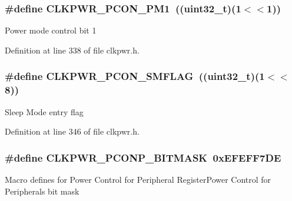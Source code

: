 \subsubsection[{\texorpdfstring{C\+L\+K\+P\+W\+R\+\_\+\+P\+C\+O\+N\+\_\+\+P\+M1}{CLKPWR_PCON_PM1}}]{\setlength{\rightskip}{0pt plus 5cm}\#define C\+L\+K\+P\+W\+R\+\_\+\+P\+C\+O\+N\+\_\+\+P\+M1~(({\bf uint32\+\_\+t})(1$<$$<$1))}\hypertarget{group___c_l_k_p_w_r___private___macros_ga0ab773fbd9de0524bee62239fd9afc78}{}\label{group___c_l_k_p_w_r___private___macros_ga0ab773fbd9de0524bee62239fd9afc78}
Power mode control bit 1 

Definition at line 338 of file clkpwr.\+h.

\subsubsection[{\texorpdfstring{C\+L\+K\+P\+W\+R\+\_\+\+P\+C\+O\+N\+\_\+\+S\+M\+F\+L\+AG}{CLKPWR_PCON_SMFLAG}}]{\setlength{\rightskip}{0pt plus 5cm}\#define C\+L\+K\+P\+W\+R\+\_\+\+P\+C\+O\+N\+\_\+\+S\+M\+F\+L\+AG~(({\bf uint32\+\_\+t})(1$<$$<$8))}\hypertarget{group___c_l_k_p_w_r___private___macros_gadbf4e45129e56e124fcccd085597ffb8}{}\label{group___c_l_k_p_w_r___private___macros_gadbf4e45129e56e124fcccd085597ffb8}
Sleep Mode entry flag 

Definition at line 346 of file clkpwr.\+h.

\subsubsection[{\texorpdfstring{C\+L\+K\+P\+W\+R\+\_\+\+P\+C\+O\+N\+P\+\_\+\+B\+I\+T\+M\+A\+SK}{CLKPWR_PCONP_BITMASK}}]{\setlength{\rightskip}{0pt plus 5cm}\#define C\+L\+K\+P\+W\+R\+\_\+\+P\+C\+O\+N\+P\+\_\+\+B\+I\+T\+M\+A\+SK~0x\+E\+F\+E\+F\+F7\+DE}\hypertarget{group___c_l_k_p_w_r___private___macros_gaf50970fcbb5758ba9699c016114ae066}{}\label{group___c_l_k_p_w_r___private___macros_gaf50970fcbb5758ba9699c016114ae066}
Macro defines for Power Control for Peripheral Register\+Power Control for Peripherals bit mask 


